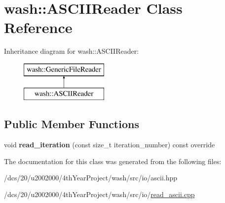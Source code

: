 \hypertarget{classwash_1_1ASCIIReader}{}\section{wash\+:\+:A\+S\+C\+I\+I\+Reader Class Reference}
\label{classwash_1_1ASCIIReader}
Inheritance diagram for wash\+:\+:A\+S\+C\+I\+I\+Reader\+:\begin{figure}[H]
\begin{center}
\leavevmode
\includegraphics[height=2.000000cm]{classwash_1_1ASCIIReader}
\end{center}
\end{figure}
\subsection*{Public Member Functions}
\begin{DoxyCompactItemize}
\item 
\mbox{\label{classwash_1_1ASCIIReader_ae9248e52a7bcf48e54b1cd63cebf3d42}} 
void {\bfseries read\+\_\+iteration} (const size\+\_\+t iteration\+\_\+number) const override
\end{DoxyCompactItemize}


The documentation for this class was generated from the following files\+:\begin{DoxyCompactItemize}
\item 
/dcs/20/u2002000/4th\+Year\+Project/wash/src/io/ascii.\+hpp\item 
/dcs/20/u2002000/4th\+Year\+Project/wash/src/io/\mbox{\hyperlink{read__ascii_8cpp}{read\+\_\+ascii.\+cpp}}\end{DoxyCompactItemize}
